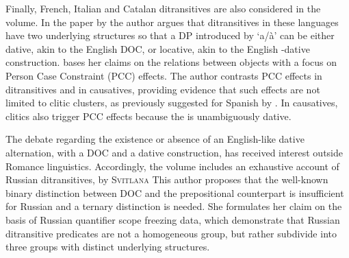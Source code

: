 \documentclass[output=paper,modfonts,nonflat]{langsci/langscibook}
\begin{document}
\begin{styleListNumberi}
Finally, French, Italian and Catalan ditransitives are also considered in the volume. In the paper by the author argues that ditransitives in these languages have two underlying structures so that a DP introduced by ‘a/à’ can be either dative, akin to the English DOC, or locative, akin to the English -dative construction. bases her claims on the relations between objects with a focus on Person Case Constraint (PCC) effects. The author contrasts PCC effects in ditransitives and in causatives, providing evidence that such effects are not limited to clitic clusters, as previously suggested for Spanish by \citet{OrmazabalRomero2013}. In causatives, clitics also trigger PCC effects because the  is unambiguously dative.
\end{styleListNumberi}

\begin{styleListNumberi}
The debate regarding the existence or absence of an English-like dative alternation, with a DOC and a dative construction, has received interest outside Romance linguistics. Accordingly, the volume includes an exhaustive account of Russian ditransitives, by \textsc{Svitlana} This author proposes that the well-known binary distinction between DOC and the prepositional counterpart is insufficient for Russian and a ternary distinction is needed. She formulates her claim on the basis of Russian quantifier scope freezing data, which demonstrate that Russian ditransitive predicates are not a homogeneous group, but rather subdivide into three groups with distinct underlying structures. 
\end{styleListNumberi}
\end{document}
